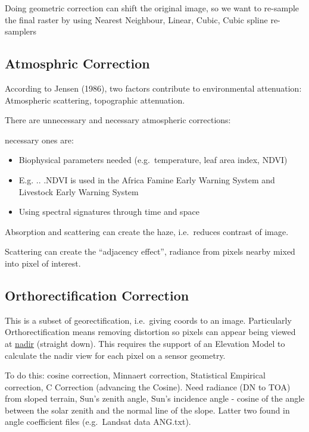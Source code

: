 \documentclass[
  letterpaper,
  DIV=11,
  numbers=noendperiod]{scrreprt}
\begin{document}
Doing geometric correction can shift the original image, so we want to
re-sample the final raster by using Nearest Neighbour, Linear, Cubic,
Cubic spline re-samplers

\hypertarget{atmosphric-correction}{%
\subsection{Atmosphric Correction}\label{atmosphric-correction}}

According to Jensen (1986), two factors contribute to environmental
attenuation: Atmospheric scattering, topographic attenuation.

There are unnecessary and necessary atmospheric corrections:

necessary ones are:

\begin{itemize}
\item
  Biophysical parameters needed (e.g.~temperature, leaf area index,
  NDVI)
\item
  E.g. .. .NDVI is used in the Africa Famine Early Warning System and
  Livestock Early Warning System
\item
  Using spectral signatures through time and space
\end{itemize}

Absorption and scattering can create the haze, i.e.~reduces contrast of
image.

Scattering can create the ``adjacency effect'', radiance from pixels
nearby mixed into pixel of interest.

\hypertarget{orthorectification-correction}{%
\subsection{Orthorectification
Correction}\label{orthorectification-correction}}

This is a subset of georectification, i.e.~giving coords to an image.
Particularly Orthorectification means removing distortion so pixels can
appear being viewed at \uline{nadir} (straight down). This requires the
support of an Elevation Model to calculate the nadir view for each pixel
on a sensor geometry.

To do this: cosine correction, Minnaert correction, Statistical
Empirical correction, C Correction (advancing the Cosine). Need radiance
(DN to TOA) from sloped terrain, Sun's zenith angle, Sun's incidence
angle - cosine of the angle between the solar zenith and the normal line
of the slope. Latter two found in angle coefficient files (e.g.~Landsat
data ANG.txt).
\end{document}
